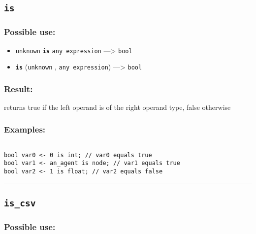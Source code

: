 \documentclass[]{book}
\providecommand{\tightlist}{%
  \setlength{\itemsep}{0pt}\setlength{\parskip}{0pt}}
\theoremstyle{definition}
\theoremstyle{definition}
\theoremstyle{definition}
\theoremstyle{remark}
\begin{document}
\subsection{\texorpdfstring{\texttt{is}}{is}}\label{is}

\subsubsection{Possible use:}\label{possible-use-284}

\begin{itemize}
\tightlist
\item
  \texttt{unknown} \textbf{\texttt{is}} \texttt{any\ expression}
  ---\textgreater{} \texttt{bool}
\item
  \textbf{\texttt{is}} (\texttt{unknown} , \texttt{any\ expression})
  ---\textgreater{} \texttt{bool}
\end{itemize}

\subsubsection{Result:}\label{result-274}

returns true if the left operand is of the right operand type, false
otherwise

\subsubsection{Examples:}\label{examples-214}

\begin{verbatim}
 
bool var0 <- 0 is int; // var0 equals true 
bool var1 <- an_agent is node; // var1 equals true 
bool var2 <- 1 is float; // var2 equals false
\end{verbatim}

\begin{center}\rule{0.5\linewidth}{\linethickness}\end{center}

\subsection{\texorpdfstring{\texttt{is\_csv}}{is\_csv}}\label{is_csv}

\subsubsection{Possible use:}\label{possible-use-285}
\end{document}
